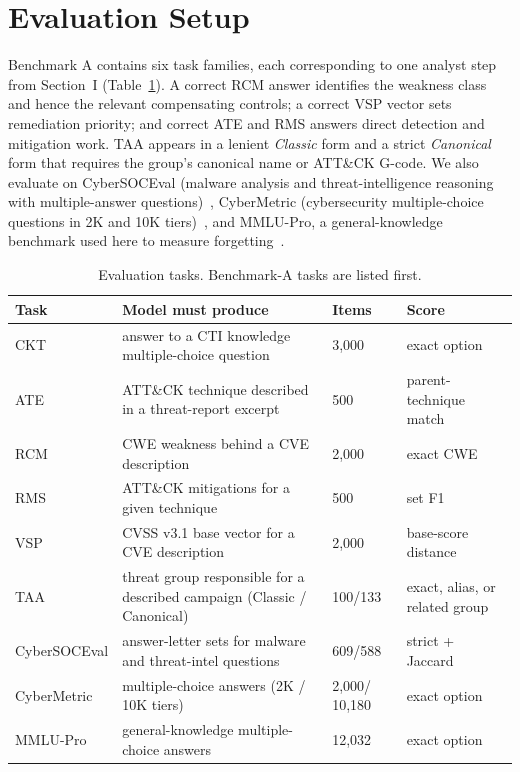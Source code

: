 \documentclass[conference]{IEEEtran}
\begin{document}
\section{Evaluation Setup}\label{sec:eval}
Benchmark A contains six task families, each corresponding to one analyst step from Section~I (Table~\ref{tab:eval}). A correct RCM answer identifies the weakness class and hence the relevant compensating controls; a correct VSP vector sets remediation priority; and correct ATE and RMS answers direct detection and mitigation work. TAA appears in a lenient \emph{Classic} form and a strict \emph{Canonical} form that requires the group's canonical name or ATT\&CK G-code. We also evaluate on CyberSOCEval (malware analysis and threat-intelligence reasoning with multiple-answer questions)~\cite{deason2025cybersoceval}, CyberMetric (cybersecurity multiple-choice questions in 2K and 10K tiers)~\cite{tihanyi2024cybermetric}, and MMLU-Pro, a general-knowledge benchmark used here to measure forgetting~\cite{wang2024mmlupro}.

\begin{table}[t]
\caption{Evaluation tasks. Benchmark-A tasks are listed first.}
\label{tab:eval}
\centering
\scriptsize
\setlength{\tabcolsep}{2.5pt}
\begin{tabular}{@{}p{}p{}p{}p{}@{}}
\toprule
Task & Model must produce & Items & Score \\
\midrule
CKT & answer to a CTI knowledge multiple-choice question & 3,000 & exact option \\
ATE & ATT\&CK technique described in a threat-report excerpt & 500 & parent-technique match \\
RCM & CWE weakness behind a CVE description & 2,000 & exact CWE \\
RMS & ATT\&CK mitigations for a given technique & 500 & set F1 \\
VSP & CVSS v3.1 base vector for a CVE description & 2,000 & base-score distance \\
TAA & threat group responsible for a described campaign (Classic / Canonical) & 100/133 & exact, alias, or related group \\
\midrule
Cyber\-SOC\-Eval & answer-letter sets for malware and threat-intel questions & 609/588 & strict + Jaccard \\
CyberMetric & multiple-choice answers (2K / 10K tiers) & 2,000/ 10,180 & exact option \\
MMLU-Pro & general-knowledge multiple-choice answers & 12,032 & exact option \\
\bottomrule
\end{tabular}
\end{table}
\end{document}
